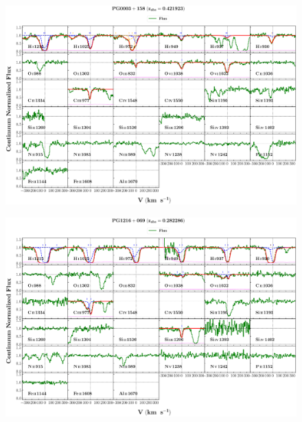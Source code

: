 \documentclass[12pt]{report}
\begin{document}
\begin{landscape}

    \begin{figure}
    \centering
    \vspace{-20mm}
    \hspace*{-35mm}
    \includegraphics[width=1.25\linewidth]{sys_plots_full/PG0003+158_z=0.421923_sys_plot_full.png}
    \end{figure}
    
\end{landscape}


\begin{landscape}

    \begin{figure}
    \centering
    \vspace{-20mm}
    \hspace*{-35mm}
    \includegraphics[width=1.25\linewidth]{sys_plots_full/PG1216+069_z=0.282286_sys_plot_full.png}
    \end{figure}
    
\end{landscape}
\end{document}
